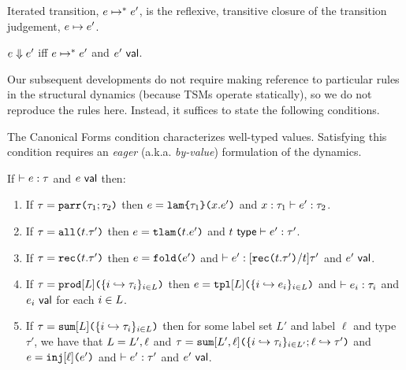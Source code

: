 \begingroup
\def\thetheorem{\ref{defn:iterated-transition-UP}}
\begin{definition} Iterated transition, $e \mapsto^{*} e'$, is the reflexive, transitive closure of the transition judgement, $e \mapsto e'$.\end{definition}
\endgroup

\begingroup
\def\thetheorem{\ref{defn:evaluation-UP}}
\begin{definition}[Evaluation] $e \Downarrow e'$ iff $e \mapsto^{*} e'$ and $e'~\mathsf{val}$. \end{definition}
\endgroup

Our subsequent developments do not require making reference to particular rules in the structural dynamics (because TSMs operate statically), so we do not reproduce the rules here. Instead, it suffices to state the following conditions.

The Canonical Forms condition characterizes well-typed values. Satisfying this condition requires an \emph{eager} (a.k.a. \emph{by-value}) formulation of the dynamics. 
\begingroup
\def\thetheorem{\ref{condition:canonical-forms-UP}}
\begin{condition} If $\vdash e : \tau$ and $e~\mathsf{val}$ then:
\begin{enumerate}
\item If $\tau=\texttt{parr}\texttt{(}\tau_1; \tau_2\texttt{)}$ then $e=\texttt{lam}\texttt{\{}\tau_1\texttt{\}(}x.e'\texttt{)}$ and $x : \tau_1 \vdash e' : \tau_2$.
\item If $\tau=\texttt{all}\texttt{(}t.\tau'\texttt{)}$ then $e=\texttt{tlam}\texttt{(}t.e'\texttt{)}$ and $t~\mathsf{type} \vdash e' : \tau'$.
\item If $\tau=\texttt{rec}\texttt{(}t.\tau'\texttt{)}$ then $e=\texttt{fold}\texttt{(}e'\texttt{)}$ and $\vdash e' : [\texttt{rec}\texttt{(}t.\tau'\texttt{)}/t]\tau'$ and $e'~\mathsf{val}$. 
\item If $\tau=\texttt{prod}[L]\texttt{(}\{i \hookrightarrow \tau_{i}\}_{i \in L}\texttt{)}$ then $e=\texttt{tpl}[L]\texttt{(}\{i \hookrightarrow e_{i}\}_{i \in L}\texttt{)}$ and $\vdash e_i : \tau_i$ and $e_i~\mathsf{val}$ for each $i \in L$.
\item If $\tau=\texttt{sum}[L]\texttt{(}\{i \hookrightarrow \tau_{i}\}_{i \in L}\texttt{)}$ then for some label set $L'$ and label $\ell$ and type $\tau'$, we have that $L=L', \ell$ and $\tau=\texttt{sum}[L', \ell]\texttt{(}\{i \hookrightarrow \tau_{i}\}_{i \in L'}; \ell \hookrightarrow \tau'\texttt{)}$ and $e=\texttt{inj}[\ell]\texttt{(}e'\texttt{)}$ and $\vdash e' : \tau'$ and $e'~\mathsf{val}$.
\end{enumerate}\end{condition}
\endgroup

